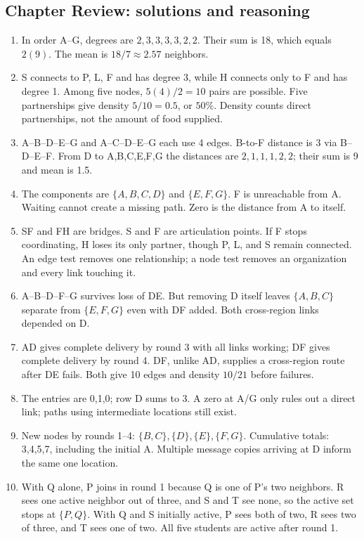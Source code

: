 \documentclass[11pt,letterpaper]{article}
\begin{document}
{\subsection*{Chapter Review: solutions and reasoning}
\begin{enumerate}
\item In order A--G, degrees are $2,3,3,3,3,2,2$. Their sum is 18, which equals $2(9)$. The mean is $18/7\approx2.57$ neighbors.
\item S connects to P, L, F and has degree 3, while H connects only to F and has degree 1. Among five nodes, $5(4)/2=10$ pairs are possible. Five partnerships give density $5/10=0.5$, or $50\%$. Density counts direct partnerships, not the amount of food supplied.
\item A--B--D--E--G and A--C--D--E--G each use 4 edges. B-to-F distance is 3 via B--D--E--F. From D to A,B,C,E,F,G the distances are $2,1,1,1,2,2$; their sum is 9 and mean is 1.5.
\item The components are $\{A,B,C,D\}$ and $\{E,F,G\}$. F is unreachable from A. Waiting cannot create a missing path. Zero is the distance from A to itself.
\item SF and FH are bridges. S and F are articulation points. If F stops coordinating, H loses its only partner, though P, L, and S remain connected. An edge test removes one relationship; a node test removes an organization and every link touching it.
\item A--B--D--F--G survives loss of DE. But removing D itself leaves $\{A,B,C\}$ separate from $\{E,F,G\}$ even with DF added. Both cross-region links depended on D.
\item AD gives complete delivery by round 3 with all links working; DF gives complete delivery by round 4. DF, unlike AD, supplies a cross-region route after DE fails. Both give 10 edges and density $10/21$ before failures.
\item The entries are 0,1,0; row D sums to 3. A zero at A/G only rules out a direct link; paths using intermediate locations still exist.
\item New nodes by rounds 1--4: $\{B,C\},\{D\},\{E\},\{F,G\}$. Cumulative totals: 3,4,5,7, including the initial A. Multiple message copies arriving at D inform the same one location.
\item With Q alone, P joins in round 1 because Q is one of P's two neighbors. R sees one active neighbor out of three, and S and T see none, so the active set stops at $\{P,Q\}$. With Q and S initially active, P sees both of two, R sees two of three, and T sees one of two. All five students are active after round 1.

\end{enumerate}}
\end{document}
